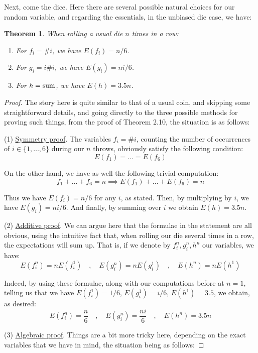 \documentclass[12pt]{amsbook}
\newtheorem{theorem}{Theorem}[chapter]
\begin{document}
Next, come the dice. Here there are several possible natural choices for our random variable, and regarding the essentials, in the unbiased die case, we have:

\begin{theorem}
When rolling a usual die $n$ times in a row:
\begin{enumerate}
\item For $f_i=\#i$, we have $E(f_i)=n/6$.

\item For $g_i=i\#i$, we have $E(g_i)=ni/6$.

\item For $h={\rm sum}$, we have $E(h)=3.5n$.
\end{enumerate} 
\end{theorem}

\begin{proof}
The story here is quite similar to that of a usual coin, and skipping some straightforward details, and going directly to the three possible methods for proving such things, from the proof of Theorem 2.10, the situation is as follows:

\medskip

(1) \underline{Symmetry proof}. The variables $f_i=\#i$, counting the number of occurrences of $i\in\{1,\ldots,6\}$ during our $n$ throws, obviously satisfy the following condition:
$$E(f_1)=\ldots=E(f_6)$$

On the other hand, we have as well the following trivial computation:
$$f_1+\ldots+f_6=n\implies E(f_1)+\ldots+E(f_6)=n$$

Thus we have $E(f_i)=n/6$ for any $i$, as stated. Then, by multiplying by $i$, we have $E(g_i)=ni/6$. And finally, by summing over $i$ we obtain $E(h)=3.5n$.

\medskip

(2) \underline{Additive proof}. We can argue here that the formulae in the statement are all obvious, using the intuitive fact that, when rolling our die several times in a row, the expectations will sum up. That is, if we denote by $f_i^n,g_i^n,h^n$ our variables, we have:
$$E(f_i^n)=nE(f_i^1)\quad,\quad E(g_i^n)=nE(g_i^1)\quad,\quad E(h^n)=nE(h^1)$$

Indeed, by using these formulae, along with our computations before at $n=1$, telling us that we have $E(f_i^1)=1/6$, $E(g_i^1)=i/6$, $E(h^1)=3.5$, we obtain, as desired:
$$E(f_i^n)=\frac{n}{6}\quad,\quad E(g_i^n)=\frac{ni}{6}\quad,\quad E(h^n)=3.5n$$

(3) \underline{Algebraic proof}. Things are a bit more tricky here, depending on the exact variables that we have in mind, the situation being as follows:


\end{proof}
\end{document}

